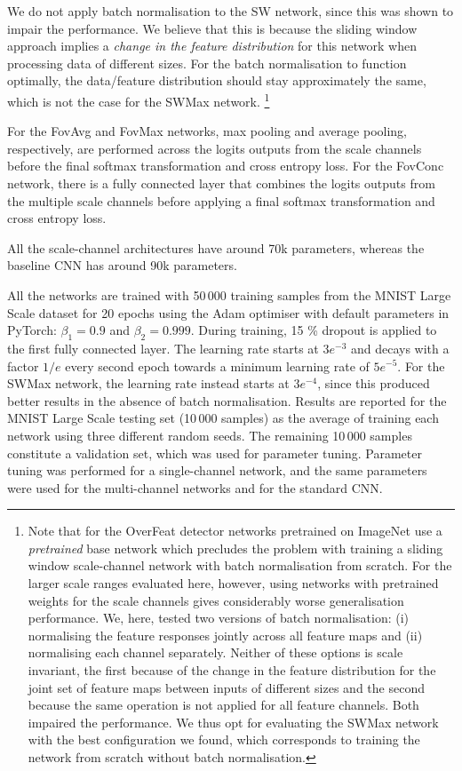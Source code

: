 \documentclass[twocolumn,runningheads]{svjour3}
\begin{document}
We do not apply batch normalisation to the SW network, since this was shown to impair the performance. We believe that this is because the
  sliding window approach implies a \emph{change in the feature
  distribution} for this network when processing data of different sizes. 
  For the batch normalisation to function optimally, the data/feature 
  distribution should stay approximately the same, which is not the case for the SWMax network. 
        \footnote{Note that for the OverFeat detector \cite{SerEigZhaMatFerLeC13-arXiv} networks pretrained on ImageNet use a \emph{pretrained} base network which precludes the problem with training a sliding window scale-channel network with batch normalisation from scratch. For the larger scale ranges evaluated here, however, using networks with pretrained weights for the scale channels gives considerably worse generalisation performance.  We, here, tested two versions of batch normalisation: (i) normalising the feature responses jointly across all feature maps and (ii) normalising each channel separately. Neither of these options is scale invariant, the first because of the change in the feature distribution for the joint set of feature maps between inputs of different sizes and the second because the same operation is not applied for all feature channels. Both impaired the performance. We thus opt for evaluating the SWMax network with the best configuration we found, which corresponds to training the network from scratch without batch normalisation.}

For the FovAvg and FovMax networks, max pooling and average pooling, respectively, are performed across the logits outputs from the scale channels before the final softmax transformation and cross entropy loss. For the FovConc network, there is a fully connected layer that combines the logits outputs from the multiple scale channels before applying a final softmax transformation and cross entropy loss.

 All the scale-channel
architectures have around 70k parameters, whereas the baseline CNN
has around 90k parameters.

All the networks are trained with 50\,000 training samples from the
MNIST Large Scale dataset for 20 epochs using the Adam optimiser
with default parameters in PyTorch: $\beta_1 = 0.9$ and $\beta_2 = 0.999$.
During training, 15 \% dropout is applied to the first fully connected
layer. The learning rate starts at $3e^{-3}$ and decays with a factor
$1/e$ every second epoch towards a minimum learning rate of
$5e^{-5}$. For the SWMax network, the learning rate instead starts at $3e^{-4}$, since this produced better results in the absence of batch normalisation. Results are reported for the MNIST Large Scale testing set
(10\,000 samples) as the average of training each network using three
different random seeds. The remaining 10\,000 samples constitute a
validation set, which was used for parameter tuning. Parameter tuning was performed for a single-channel network, and the same parameters were used for the multi-channel networks and for the standard CNN.
\end{document}
